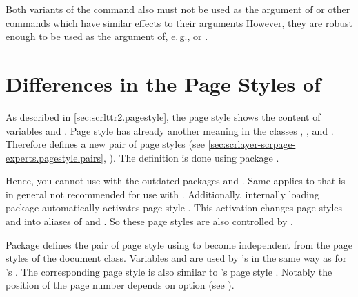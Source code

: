 Both variants of the command also must not be used as the
argument of  or other commands
which have similar effects to their arguments However, they are robust enough
to be used as the argument of, e.\,g.,  or
.%
%
\EndIndexGroup
%
\EndIndexGroup


\section{Differences in the Page Styles of }
\BeginIndexGroup
{}

As described in \autoref{sec:scrlttr2.pagestyle}, the page style
 shows the content of variables  and
. Page style  has already another
meaning in the \KOMAScript{} classes , , and
. Therefore  defines a new pair of page
styles (see \autoref{sec:scrlayer-scrpage-experts.pagestyle.pairs},
).  The definition
is done using package
.

Hence, you cannot use  with the outdated packages
 and
. Same applies to
 that is in general not recommended
for use with \KOMAScript. Additionally, internally loading package
 automatically activates page style
. This activation
changes page styles  and  into aliases of
 and . So these page
styles are also controlled by .

\begin{Declaration}
\end{Declaration}
Package  defines the pair of page style 
using  to become independent from the page styles of
the document class. Variables  and  are
used by 's  in the same way as for
's . The corresponding 
page style is also similar to 's page style
. Notably the position of the page number depends on option
 (see
).%
\EndIndexGroup


